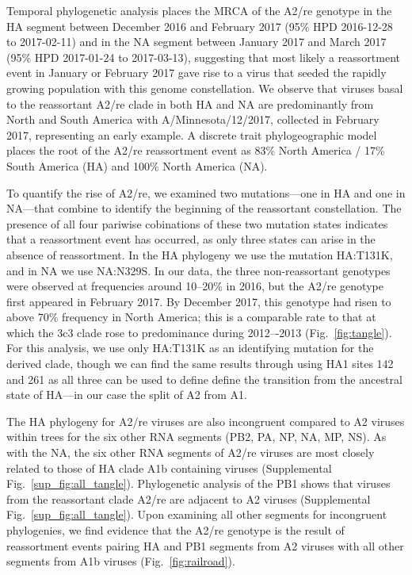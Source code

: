 Temporal phylogenetic analysis places the MRCA of the A2/re genotype in the HA segment between December 2016 and February 2017 (95\% HPD 2016-12-28 to 2017-02-11) and in the NA segment between January 2017 and March 2017 (95\% HPD 2017-01-24 to 2017-03-13), suggesting that most likely a reassortment event in January or February 2017 gave rise to a virus that seeded the rapidly growing population with this genome constellation.
We observe that viruses basal to the reassortant A2/re clade in both HA and NA are predominantly from North and South America with A/Minnesota/12/2017, collected in February 2017, representing an early example.
A discrete trait phylogeographic model places the root of the A2/re reassortment event as 83\% North America / 17\% South America (HA) and 100\% North America (NA).

To quantify the rise of A2/re, we examined two mutations---one in HA and one in NA---that combine to identify the beginning of the reassortant constellation.
The presence of all four pariwise cobinations of these two mutation states indicates that a reassortment event has occurred, as only three states can arise in the absence of reassortment.
In the HA phylogeny we use the mutation HA:T131K, and in NA we use NA:N329S.
In our data, the three non-reassortant genotypes were observed at frequencies around 10--20\% in 2016, but the A2/re genotype first appeared in February 2017.
By December 2017, this genotype had risen to above 70\% frequency in North America; this is a comparable rate to that at which the 3c3 clade rose to predominance during 2012–-2013 (Fig.~\ref{fig:tangle}).
For this analysis, we use only HA:T131K as an identifying mutation for the derived clade, though we can find the same results through using HA1 sites 142 and 261 as all three can be used to define define the transition from the ancestral state of HA---in our case the split of A2 from A1.

The HA phylogeny for A2/re viruses are also incongruent compared to A2 viruses within trees for the six other RNA segments (PB2, PA, NP, NA, MP, NS).
As with the NA, the six other RNA segments of A2/re viruses are most closely related to those of HA clade A1b containing viruses (Supplemental Fig.~\ref{sup_fig:all_tangle}).
Phylogenetic analysis of the PB1 shows that viruses from the reassortant clade A2/re are adjacent to A2 viruses (Supplemental Fig.~\ref{sup_fig:all_tangle}).
Upon examining all other segments for incongruent phylogenies, we find evidence that the A2/re genotype is the result of reassortment events pairing HA and PB1 segments from A2 viruses with all other segments from A1b viruses (Fig.~\ref{fig:railroad}).

